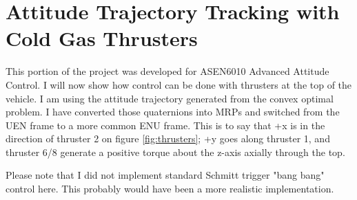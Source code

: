

\section{Attitude Trajectory Tracking with Cold Gas Thrusters}
This portion of the project was developed for ASEN6010 Advanced Attitude Control. I will now show how control can be done with thrusters at the top of the vehicle. I am using the attitude trajectory generated from the convex optimal problem. I have converted those quaternions into MRPs and switched from the UEN frame to a more common ENU frame. This is to say that +x is in the direction of thruster 2 on figure \ref{fig:thrusters}; +y goes along thruster 1, and thruster 6/8 generate a positive torque about the z-axis axially through the top.

Please note that I did not implement standard Schmitt trigger "bang bang" control here. This probably would have been a more realistic implementation.



